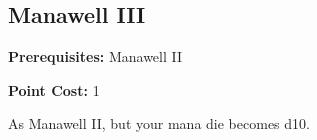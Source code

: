 \subsection{Manawell III}\label{feat:manawell3}

\noindent
\textbf{Prerequisites:} Manawell II

\noindent
\textbf{Point Cost:} 1 

As Manawell II, but your mana die becomes d10.
